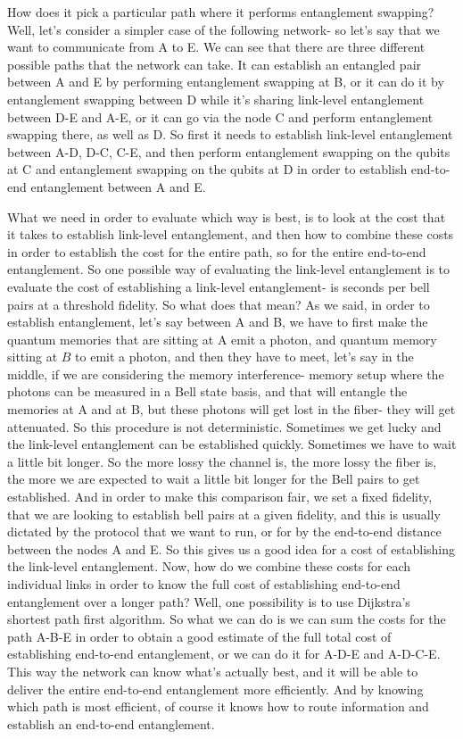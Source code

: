 How does it pick a particular path where it performs entanglement swapping? Well, let's consider a simpler case of the following network- so let's say that we want to communicate from A to E. We can see that there are three different possible paths that the network can take. It can establish an entangled pair between A and E by performing entanglement swapping at B, or it can do it by entanglement swapping between D while it's sharing link-level entanglement between D-E and A-E, or it can go via the node C and perform entanglement swapping there, as well as D. So first it needs to establish link-level entanglement between A-D, D-C, C-E, and then perform entanglement swapping on the qubits at C and entanglement swapping on the qubits at D in order to establish end-to-end entanglement between A and E.

What we need in order to evaluate which way is best, is to look at the cost that it takes to establish link-level entanglement, and then how to combine these costs in order to establish the cost for the entire path, so for the entire end-to-end entanglement. So one possible way of evaluating the link-level entanglement is to evaluate the cost of establishing a link-level entanglement- is seconds per bell pairs at a threshold fidelity. So what does that mean? As we said, in order to establish entanglement, let's say between A and B, we have to first make the quantum memories that are sitting at A emit a photon, and quantum memory sitting at $B$ to emit a photon, and then they have to meet, let's say in the middle, if we are considering the memory interference- memory setup where the photons can be measured in a Bell state basis, and that will entangle the memories at A and at B, but these photons will get lost in the fiber- they will get attenuated. So this procedure is not deterministic. Sometimes we get lucky and the link-level entanglement can be established quickly. Sometimes we have to wait a little bit longer. So the more lossy the channel is, the more lossy the fiber is, the more we are expected to wait a little bit longer for the Bell pairs to get established. And in order to make this comparison fair, we set a fixed fidelity, that we are looking to establish bell pairs at a given fidelity, and this is usually dictated by the protocol that we want to run, or for by the end-to-end distance between the nodes A and E. So this gives us a good idea for a cost of establishing the link-level entanglement. Now, how do we combine these costs for each individual links in order to know the full cost of establishing end-to-end entanglement over a longer path? Well, one possibility is to use Dijkstra's shortest path first algorithm. So what we can do is we can sum the costs for the path A-B-E in order to obtain a good estimate of the full total cost of establishing end-to-end entanglement, or we can do it for A-D-E and A-D-C-E. This way the network can know what's actually best, and it will be able to deliver the entire end-to-end entanglement more efficiently. And by knowing which path is most efficient, of course it knows how to route information and establish an end-to-end entanglement.

